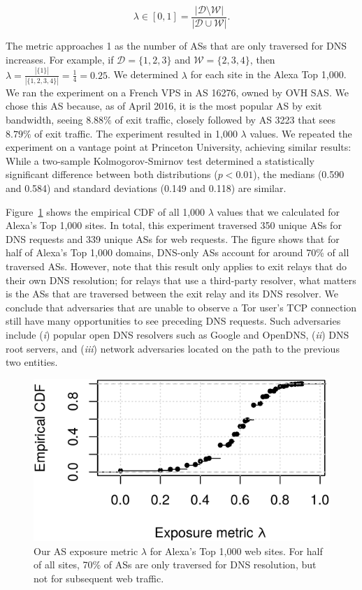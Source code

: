\begin{equation}
\label{equ:exposure}
\lambda \in [0, 1] =
\frac{|\mathcal{D} \setminus \mathcal{W}|}
     {|\mathcal{D} \cup \mathcal{W}|}.
\end{equation}

The metric approaches 1 as the number of ASs that are only traversed for DNS
increases.  For example, if $\mathcal{D} = \{1,2,3\}$ and $\mathcal{W} =
\{2,3,4\}$, then $\lambda = \frac{|\{1\}|}{|\{1,2,3,4\}|} = \frac{1}{4} =
0.25$.  We determined $\lambda$ for each site in the Alexa Top 1,000.  We ran
the experiment on a French VPS in AS 16276, owned by OVH SAS.  We chose this AS
because, as of April 2016, it is the most popular AS by exit bandwidth, seeing
$8.88\%$ of exit traffic, closely followed by AS 3223 that sees $8.79\%$ of
exit traffic.  The experiment resulted in 1,000 $\lambda$ values.  We repeated
the experiment on a vantage point at Princeton University, achieving similar
results: While a two-sample Kolmogorov-Smirnov test determined a statistically
significant difference between both distributions ($p < 0.01$), the medians
(0.590 and 0.584) and standard deviations (0.149 and 0.118) are similar.

Figure~\ref{fig:exposure} shows the empirical CDF of all 1,000 $\lambda$ values
that we calculated for Alexa's Top 1,000 sites.  In total, this experiment
traversed 350 unique ASs for DNS requests and 339 unique ASs for web requests.
The figure shows that for half of Alexa's Top 1,000 domains, DNS-only ASs
account for around 70\% of all traversed ASs.  However, note that this result
only applies to exit relays that do their own DNS resolution; for relays that
use a third-party resolver, what matters is the ASs that are traversed between
the exit relay and its DNS resolver.  We conclude that adversaries that are
unable to observe a Tor user's TCP connection still have many opportunities to
see preceding DNS requests.  Such adversaries include (\emph{i}) popular open
DNS resolvers such as Google and OpenDNS, (\emph{ii}) DNS root servers, and
(\emph{iii}) network adversaries located on the path to the previous two
entities.


\begin{figure}[t]
	\centering
	\includegraphics[width=0.75\linewidth]{figures/dns-exposure.pdf}
	\caption{Our AS exposure metric $\lambda$ for Alexa's Top 1,000 web sites.
	For half of all sites, 70\% of ASs are only traversed for DNS resolution,
	but not for subsequent web traffic.}
	\label{fig:exposure}
\end{figure}

